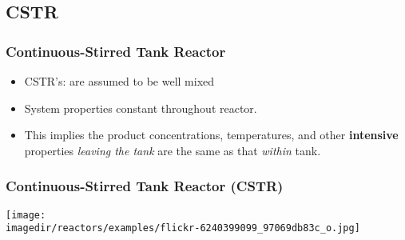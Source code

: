 \subsection{CSTR}

\begin{comment}
\begin{frame}\frametitle{\normalsize 1.4 Continuous-Flow Reactors\\1.4.1 Continuous Tank Reactors (CTR) }
	\begin{columns}
		\begin{column}{0.6\textwidth} 
			\vspace{-15mm}
			\texttt{[image: \\imagedir/reactors/mhaskar/ch1/CSTR\_unmixed\_rotated.pdf]}
		\end{column}
		\hspace{-15mm}
		\begin{column}{0.6\textwidth}
			\begin{itemize}
				\vspace{-3mm}
				\item	At any given time, $t$
				\item	$F$: Molar flow rate
				\item	$C$: Concentration
				\item	subscript $j$, $j^\text{th}$ species
				\item	subscript $0$, inlet stream
				\item	subscript $r$, reactor
			\end{itemize}
		\end{column}
	\end{columns}
	$C_{jr}$: Concentration of species j in the reactor
\end{frame}
\end{comment}

\begin{frame}\frametitle{Continuous-Stirred Tank Reactor}
	\begin{itemize}
		\item	CSTR's: are assumed to be well mixed
		\item	System properties constant throughout reactor.
		\item	This implies the product concentrations, temperatures, and other \textbf{intensive} properties \emph{leaving the tank} are the same as that \emph{within} tank.		
	\end{itemize}
\end{frame}

\begin{frame}\frametitle{Continuous-Stirred Tank Reactor (CSTR)}
	\begin{center}
		\texttt{[image: \\imagedir/reactors/examples/flickr-6240399099\_97069db83c\_o.jpg]}
	\end{center}
	\vspace{-60pt}
\end{frame}

